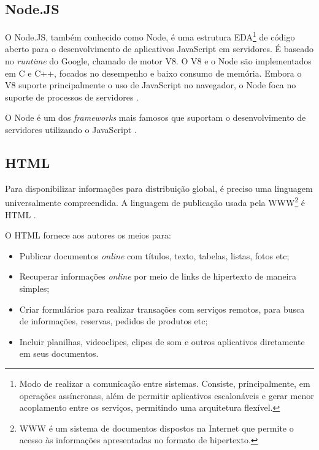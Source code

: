 
\subsection{Node.JS}

O Node.JS, também conhecido como Node, é uma estrutura EDA\footnote{Modo de realizar a comunicação entre sistemas. Consiste, principalmente, em operações assíncronas, além de permitir aplicativos escalonáveis e gerar menor acoplamento entre os serviços, permitindo uma arquitetura flexível.} de código aberto para o desenvolvimento de aplicativos JavaScript em servidores. É baseado no \textit{runtime} do Google, chamado de motor V8. O V8 e o Node são implementados em C e C++, focados no desempenho e baixo consumo de memória. Embora o V8 suporte principalmente o uso de JavaScript no navegador, o Node foca no suporte de processos de servidores \cite{Tilkov2010}.

O Node é um dos \textit{frameworks} mais famosos que suportam o desenvolvimento de servidores utilizando o JavaScript \cite{Tilkov2010}.


\subsection{HTML}

Para disponibilizar informações para distribuição global, é preciso uma linguagem universalmente compreendida. A linguagem de publicação usada pela WWW\footnote{WWW é um sistema de documentos dispostos na Internet que permite o acesso às informações apresentadas no formato de hipertexto.} é HTML \cite{html}.

O HTML fornece aos autores os meios para: 
\begin{itemize}
    \item Publicar documentos \textit{online} com títulos, texto, tabelas, listas, fotos etc;
    \item Recuperar informações \textit{online} por meio de links de hipertexto de maneira simples;
    \item Criar formulários para realizar transações com serviços remotos, para busca de informações, reservas, pedidos de produtos etc;
    \item Incluir planilhas, videoclipes, clipes de som e outros aplicativos diretamente em seus documentos.
\end{itemize}

